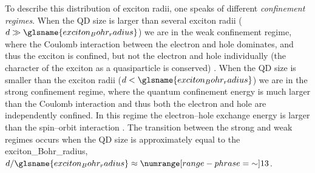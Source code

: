 \documentclass[webedition,openright,titles,swedish,english]{LuaUUThesis}\usepackage[]{graphicx}\usepackage[]{xcolor}
\begin{document}
To describe this distribution of exciton radii, one speaks of different
\emph{confinement regimes}.
When the \gls{QD} size is larger than several exciton radii ($d\gg\glsname{exciton_Bohr_radius}$)
we are in the weak confinement regime, where the Coulomb interaction between the electron
and hole dominates, and thus the exciton is confined, but not the electron and hole
individually (the character of the exciton as a quasiparticle is conserved) \cite{Kayanuma1988}.
%
When the \gls{QD} size is smaller than the exciton radii ($d<\glsname{exciton_Bohr_radius}$)
we are in the strong confinement regime,
where the quantum confinement energy is much larger than the Coulomb interaction
and thus both the electron and hole are independently confined.
In this regime the electron--hole exchange energy is larger than
the spin--orbit interaction \cite[p.\ 115]{Delerue2004}.
%
The transition between the strong and weak regimes occurs when the \gls{QD} size
is approximately equal to the \gls{exciton_Bohr_radius},
$d/\glsname{exciton_Bohr_radius}\approx\numrange[range-phrase={\ensuremath{\sim}}]{1}{3}$.
\end{document}
